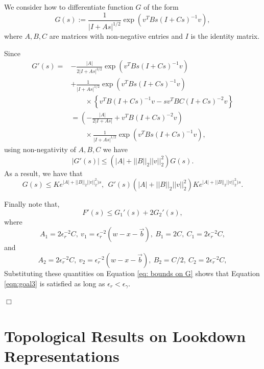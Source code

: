 \documentclass[12pt]{article}
\newenvironment {proof}{{\noindent\bf Proof }}{\hfill $\Box$ \medskip}
\newcommand{\meanq}{\vec b}    %
\newcommand{\covq}{C}     %
\begin{document}
\begin{proof}
We consider how to differentiate function $G$ of the form 
$$G(s):=\frac{1}{|I+As|^{1/2}}\exp(v^{T}Bs(I+Cs)^{-1}v),$$
where $A,B,C$ are matrices with non-negative entries and $I$ is the identity matrix.

Since 
\begin{equation}
\begin{aligned}
G'(s)=& - \frac{|A|}{2|I+As|^{3/2}}\exp(v^{T}Bs(I+Cs)^{-1}v)\\
      & + \frac{1}{|I+As|^{1/2}}\exp(v^{T}Bs(I+Cs)^{-1}v)\\
      & \qquad \times \left\{ v^{T}B(I+Cs)^{-1}v
                            - sv^{T}BC(I+Cs)^{-2}v
                    \right\}\\
      &=\left(- \frac{|A|}{2|I+As|}+v^{T}B(I+Cs)^{-2}v
        \right)\\
      & \qquad \times
        \frac{1}{|I+As|^{1/2}}\exp(v^{T}Bs(I+Cs)^{-1}v),
\end{aligned}
\end{equation}
using non-negativity of $A,B,C$ we have
\begin{equation}
\label{eq: bounds on G'}
|G'(s)| \leq (|A|+||B||_{2}||v||_2^2)G(s).    
\end{equation}
As a result, we have that 
\begin{equation}
\label{eq: bounds on G}
G(s) \leq K e^{|A|+||B||_{2}||v||_2^2)s}, ~~   G'(s)(|A|+||B||_{2}||v||_2^2)K e^{|A|+||B||_{2}||v||_2^2)s}.  
\end{equation}

Finally note that, 
$$F'(s) \leq G_1'(s)+2G_2'(s),$$
where 
$$A_1= 2\epsilon_r^{-2} \covq, ~ v_1=\epsilon_r^{-2}(w-x-\meanq), ~B_1 = 2\covq, ~C_1=2\epsilon_r^{-2} \covq,$$
and 
$$A_2= 2\epsilon_r^{-2} \covq, ~ v_2=\epsilon_r^{-2}(w-x-\meanq), ~B_2 = \covq/2, ~C_2=2\epsilon_r^{-2} \covq,$$
Substituting these quantities on Equation \eqref{eq: bounds on G} shows that Equation \eqref{eqn:goal3} is satisfied as long as $\epsilon_r < \epsilon_\gamma$.
 
\end{proof}
\section{Topological Results on Lookdown Representations}
\label{sec: Topologies on Lookdown}
\end{document}
